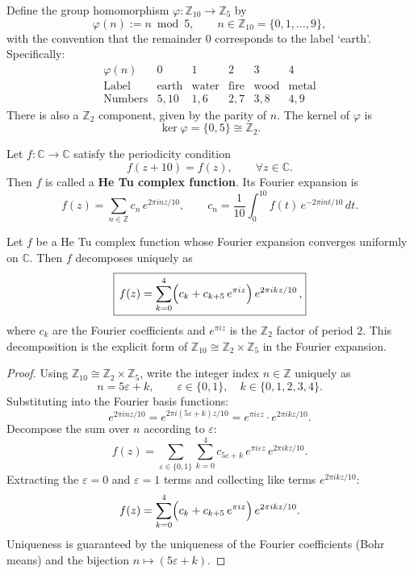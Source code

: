 \begin{definition}\label{def:hetu_mapping}
Define the group homomorphism $\varphi: \mathbb{Z}_{10} \to \mathbb{Z}_5$ by
\[
\varphi(n) := n \bmod 5, \qquad n \in \mathbb{Z}_{10} = \{0, 1, \dots, 9\},
\]
with the convention that the remainder $0$ corresponds to the label `earth'. Specifically:
\[
\begin{array}{c|ccccc}
\varphi(n) & 0 & 1 & 2 & 3 & 4 \\
\hline
\text{Label} & \text{earth} & \text{water} & \text{fire} & \text{wood} & \text{metal} \\
\text{Numbers} & 5, 10 & 1, 6 & 2, 7 & 3, 8 & 4, 9
\end{array}
\]
There is also a $\mathbb{Z}_2$ component, given by the parity of $n$. The kernel of $\varphi$ is
\[
\ker \varphi = \{0, 5\} \cong \mathbb{Z}_2.
\]
\end{definition}

\begin{definition}\label{def:hetu_function}
Let $f: \mathbb{C} \to \mathbb{C}$ satisfy the periodicity condition
\[
f(z + 10) = f(z), \qquad \forall z \in \mathbb{C}.
\]
Then $f$ is called a \textbf{He Tu complex function}. Its Fourier expansion is
\[
f(z) = \sum_{n \in \mathbb{Z}} c_n\, e^{2\pi i n z / 10}, \qquad c_n = \frac{1}{10}\int_0^{10} f(t)\, e^{-2\pi i n t / 10}\, dt.
\]
\end{definition}

\begin{theorem}\label{thm:hetu_fourier_decomposition}
Let $f$ be a He Tu complex function whose Fourier expansion converges uniformly on $\mathbb{C}$. Then $f$ decomposes uniquely as
\[
\boxed{\,f(z) = \sum_{k=0}^{4} \Bigl( c_k + c_{k+5}\, e^{\pi i z} \Bigr)\, e^{2\pi i k z / 10}\,,}
\]
where $c_k$ are the Fourier coefficients and $e^{\pi i z}$ is the $\mathbb{Z}_2$ factor of period $2$. This decomposition is the explicit form of $\mathbb{Z}_{10} \cong \mathbb{Z}_2 \times \mathbb{Z}_5$ in the Fourier expansion.
\end{theorem}

\begin{proof}
Using $\mathbb{Z}_{10} \cong \mathbb{Z}_2 \times \mathbb{Z}_5$, write the integer index $n \in \mathbb{Z}$ uniquely as
\[
n = 5\varepsilon + k, \qquad \varepsilon \in \{0, 1\}, \quad k \in \{0, 1, 2, 3, 4\}.
\]
Substituting into the Fourier basis functions:
\[
e^{2\pi i n z / 10} = e^{2\pi i (5\varepsilon + k) z / 10} = e^{\pi i \varepsilon z} \cdot e^{2\pi i k z / 10}.
\]
Decompose the sum over $n$ according to $\varepsilon$:
\[
f(z) = \sum_{\varepsilon \in \{0,1\}} \sum_{k=0}^{4} c_{5\varepsilon+k}\, e^{\pi i \varepsilon z}\, e^{2\pi i k z / 10}.
\]
Extracting the $\varepsilon = 0$ and $\varepsilon = 1$ terms and collecting like terms $e^{2\pi i k z / 10}$:
\[
f(z) = \sum_{k=0}^{4} \Bigl( c_k + c_{k+5}\, e^{\pi i z} \Bigr)\, e^{2\pi i k z / 10}.
\]
Uniqueness is guaranteed by the uniqueness of the Fourier coefficients (Bohr means) and the bijection $n \mapsto (5\varepsilon + k)$.
\end{proof}

